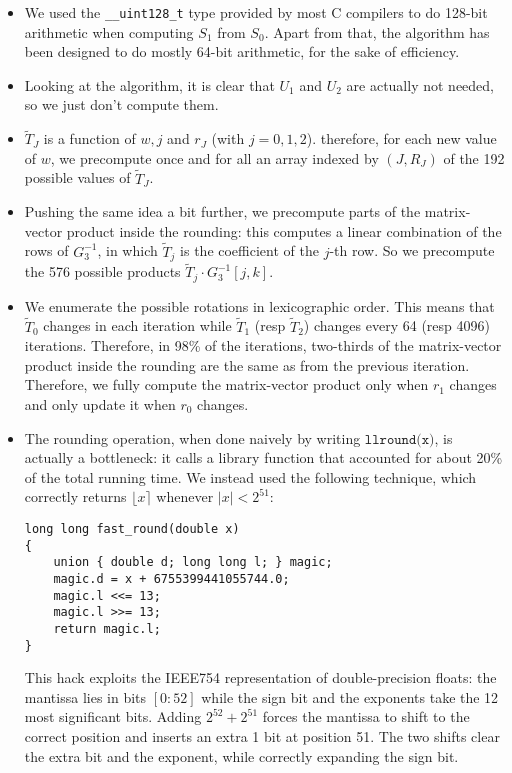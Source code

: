 \documentclass[journal=tosc,final]{iacrtrans}
\begin{document}
\begin{itemize}
\item We used the \verb|__uint128_t| type provided by most \textsf{C} compilers
  to do 128-bit arithmetic when computing $S_1$ from $S_0$. Apart from that, the
  algorithm has been designed to do mostly 64-bit arithmetic, for the sake of
  efficiency.
  
\item Looking at the algorithm, it is clear that $U_1$ and $U_2$ are actually
  not needed, so we just don't compute them.
  
\item $\widetilde{T}_J$ is a function of $w, j$ and $r_J$ (with
  $j=0,1,2$). therefore, for each new value of $w$, we precompute once and for
  all an array indexed by $(J, R_J)$ of the 192 possible values of
  $\widetilde{T}_J$.

\item Pushing the same idea a bit further, we precompute parts of the
  matrix-vector product inside the rounding: this computes a linear combination
  of the rows of $G_3^{-1}$, in which $\widetilde{T}_j$ is the coefficient of
  the $j$-th row. So we precompute the 576 possible products $\widetilde{T}_j \cdot G_3^{-1}[j, k]$.

\item We enumerate the possible rotations in lexicographic order. This means
  that $\widetilde{T}_0$ changes in each iteration while $\widetilde{T}_1$ (resp
  $\widetilde{T}_2$) changes every 64 (resp 4096) iterations. Therefore, in 98\%
  of the iterations, two-thirds of the matrix-vector product inside the rounding
  are the same as from the previous iteration. Therefore, we fully compute the
  matrix-vector product only when $r_1$ changes and only update it when $r_0$
  changes.

\item The rounding operation, when done naively by writing
  $\texttt{llround(x)}$, is actually a bottleneck: it calls a library function
  that accounted for about 20\% of the total running time. We instead used the
  following technique, which correctly returns $\lfloor x \rceil$ whenever
  $|x| < 2^{51}$:
  \begin{verbatim}
long long fast_round(double x)
{
    union { double d; long long l; } magic; 
    magic.d = x + 6755399441055744.0;
    magic.l <<= 13; 
    magic.l >>= 13;
    return magic.l;
}
\end{verbatim}
This hack exploits the IEEE754 representation of double-precision floats: the
mantissa lies in bits $[0:52]$ while the sign bit and the exponents take the 12
most significant bits. Adding $2^{52}+2^{51}$ forces the mantissa to shift to
the correct position and inserts an extra 1 bit at position 51. The two shifts
clear the extra bit and the exponent, while correctly expanding the sign bit.
\end{itemize}
\end{document}
